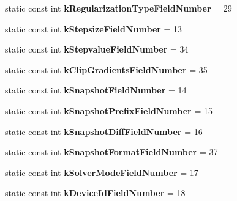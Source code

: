 \begin{DoxyCompactItemize}
static const int {\bfseries k\+Regularization\+Type\+Field\+Number} = 29
\item 
\mbox{\label{classcaffe_1_1_solver_parameter_a90997c397e1e1b2e4203f932d0d62a32}} 
static const int {\bfseries k\+Stepsize\+Field\+Number} = 13
\item 
\mbox{\label{classcaffe_1_1_solver_parameter_aa1d9d520a07f919dc50b3851e6afc1e0}} 
static const int {\bfseries k\+Stepvalue\+Field\+Number} = 34
\item 
\mbox{\label{classcaffe_1_1_solver_parameter_a1f2708aada7accb746ad02d40a8ea5e1}} 
static const int {\bfseries k\+Clip\+Gradients\+Field\+Number} = 35
\item 
\mbox{\label{classcaffe_1_1_solver_parameter_af304317d1b98f1945888026cf5b50a1d}} 
static const int {\bfseries k\+Snapshot\+Field\+Number} = 14
\item 
\mbox{\label{classcaffe_1_1_solver_parameter_a53d210830c82d42c8daaf29399d818b8}} 
static const int {\bfseries k\+Snapshot\+Prefix\+Field\+Number} = 15
\item 
\mbox{\label{classcaffe_1_1_solver_parameter_a0ce9bfaf4d94e35c31325cd7838e9fee}} 
static const int {\bfseries k\+Snapshot\+Diff\+Field\+Number} = 16
\item 
\mbox{\label{classcaffe_1_1_solver_parameter_ab433f07dad32576f96d837c7ccbc516e}} 
static const int {\bfseries k\+Snapshot\+Format\+Field\+Number} = 37
\item 
\mbox{\label{classcaffe_1_1_solver_parameter_a0759427960a1229808606c2080e0d7ac}} 
static const int {\bfseries k\+Solver\+Mode\+Field\+Number} = 17
\item 
\mbox{\label{classcaffe_1_1_solver_parameter_a00a49c029414dbc15726dee6431cf162}} 
static const int {\bfseries k\+Device\+Id\+Field\+Number} = 18
\item 
\mbox{\label{classcaffe_1_1_solver_parameter_a7eaa1f5fd6bded250c9aa8701e595b51}} 

\end{DoxyCompactItemize}
